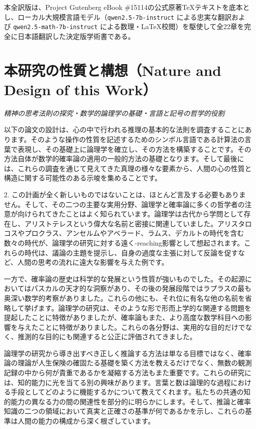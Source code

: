 \documentclass[a4paper,11pt,openany]{ltjsbook}
\begin{document}
本全訳版は、Project Gutenberg eBook \#15114の公式原著TeXテキストを底本とし、ローカル大規模言語モデル（\texttt{qwen2.5-7b-instruct} による忠実な翻訳および \texttt{qwen2.5-math-7b-instruct} による数理・LaTeX校閲）を駆使して全22章を完全に日本語翻訳した決定版学術書である。

\tableofcontents

\mainmatter


\chapter{本研究の性質と構想（Nature and Design of this Work）}
\label{ch:i}

\begin{center}
\large\textit{精神の思考法則の探究・数学的論理学の基礎・言語と記号の哲学的役割}
\end{center}
\vspace{4mm}

以下の論文の設計は、心の中で行われる推理の基本的な法則を調査することにあります。そのような操作の性質を記述するためのシンボル言語である計算法の言葉で表現し、その基礎上に論理学を確立し、その方法を構築することです。その方法自体が数学的確率論の適用の一般的方法の基礎となります。そして最後には、これらの調査を通じて見えてきた真理の様々な要素から、人間の心の性質と構造に関する可能性のある示唆を集めることです。

2. この計画が全く新しいものではないことは、ほとんど言及する必要もありません。そして、その二つの主要な実用分野、論理学と確率論に多くの哲学者の注意が向けられてきたことはよく知られています。論理学は古代から学問として存在し、アリストテレスという偉大な名前と密接に関連していました。アリスタロコスやプロクラス、アンセルムやアベラード、ラムス、デカルトの時代を含む数々の時代が、論理学の研究に対する遠く-reaching影響として想起されます。これらの時代は、議論の主題を提示し、自身の過度な主張に対して反論を促すなど、人間の思考の流れに遠大な影響を与えた例です。

一方で、確率論の歴史は科学的な発展という性質が強いものでした。その起源においてはパスカルの天才的な洞察があり、その後の発展段階ではラプラスの最も奥深い数学的考察がありました。これらの他にも、それ位に有名な他の名前を省略して挙げます。論理学の研究は、そのような形で形而上学的な関連する問題を提起したことに特徴がありましたが、確率論もまた、より高度な数学科目への影響を与えたことに特徴がありました。これらの各分野は、実用的な目的だけでなく、推測的な目的にも関連すると公正に評価されてきました。

論理学の研究から導き出すべき正しく推論する方法は単なる目標ではなく、確率論の理論が人生保険の確固たる基礎を築く方法を教えるだけでなく、無数の観測記録の中から何が貴重であるかを凝縮する方法もまた重要です。これらの研究には、知的能力に光を当てる別の興味があります。言葉と数は論理的な過程における手段としてどのように機能するかについて教えてくれます。私たちの共通の知的能力の異なる力の間の関連性を部分的に明らかにします。そして、推論と確率知識の二つの領域において真実と正確さの基準が何であるかを示し、これらの基準は人間の能力の構成から深く根ざしています。
\end{document}
